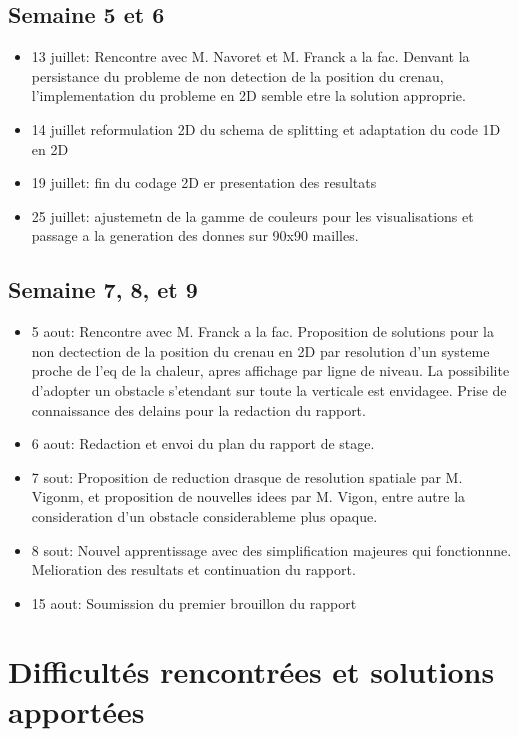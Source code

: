 \subsection{Semaine 5 et 6}

\begin{itemize}
 \item 13 juillet: Rencontre avec M. Navoret et M. Franck a la fac. Denvant la persistance du probleme de non detection de la position du crenau, l'implementation du probleme en 2D semble etre la solution approprie.
 \item 14 juillet reformulation 2D du schema de splitting et adaptation du code 1D en 2D
 \item 19 juillet: fin du codage 2D  er presentation des resultats
 \item 25 juillet: ajustemetn de la gamme de couleurs pour les visualisations et passage a la generation des donnes sur 90x90 mailles.
\end{itemize}

\subsection{Semaine 7, 8, et 9}
\begin{itemize}
 \item 5 aout: Rencontre avec M. Franck a la fac. Proposition de solutions pour la non dectection de la position du crenau en 2D par resolution d'un systeme proche de l'eq de la chaleur, apres affichage par ligne de niveau. La possibilite d'adopter un obstacle s'etendant sur toute la verticale est envidagee. Prise de connaissance des delains pour la redaction du rapport.
 \item 6 aout: Redaction et envoi du plan du rapport de stage. 
 \item 7 sout: Proposition de reduction drasque de resolution spatiale par M. Vigonm, et proposition de nouvelles idees par M. Vigon, entre autre la consideration d'un obstacle considerableme plus opaque.
 \item 8 sout: Nouvel apprentissage avec des simplification majeures qui fonctionnne. Melioration des resultats et continuation du rapport.
 \item 15 aout: Soumission du premier brouillon du rapport
\end{itemize}

\section{Difficultés rencontrées et solutions apportées}

